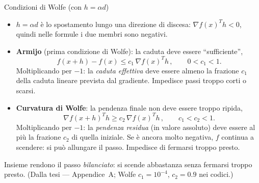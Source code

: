 \documentclass[aspectratio=169,11pt]{beamer}
\begin{document}
\begin{frame}{Condizioni di Wolfe (con $h=\alpha d$)}
  \footnotesize
  \setlength{\abovedisplayskip}{1pt}
  \setlength{\belowdisplayskip}{1pt}
  \setlength{\abovedisplayshortskip}{1pt}
  \setlength{\belowdisplayshortskip}{1pt}
  \begin{itemize}\setlength{\itemsep}{1pt}
    \item $h=\alpha d$ è lo spostamento lungo una direzione di discesa:
      $\nabla f(x)^Th<0$, quindi nelle formule i due membri sono negativi.
    \item \textbf{Armijo} (prima condizione di Wolfe): la caduta deve essere
      ``sufficiente'',
      \[
        \boxed{\,f(x+h)-f(x)\le c_1\,\nabla f(x)^Th\,},\qquad 0<c_1<1.
      \]
      Moltiplicando per $-1$: la \emph{caduta effettiva} deve essere almeno
      la frazione $c_1$ della caduta lineare prevista dal gradiente.
      Impedisce passi troppo corti o scarsi.
    \item \textbf{Curvatura di Wolfe}: la pendenza finale non deve essere
      troppo ripida,
      \[
        \boxed{\,\nabla f(x+h)^Th\ge c_2\,\nabla f(x)^Th\,},\qquad c_1<c_2<1.
      \]
      Moltiplicando per $-1$: la \emph{pendenza residua} (in valore assoluto)
      deve essere al più la frazione $c_2$ di quella iniziale. Se è ancora
      molto negativa, $f$ continua a scendere: si può allungare il passo.
      Impedisce di fermarsi troppo presto.
  \end{itemize}
  \vspace{0.03cm}
  \begin{center}
  \end{center}
  \vspace{-0.05cm}
  {\small\color{grigio} Insieme rendono il passo \emph{bilanciato}: si scende
    abbastanza senza fermarsi troppo presto. (Dalla tesi --- Appendice~A;
    Wolfe $c_1{=}10^{-4}$, $c_2{=}0.9$ nei codici.)}
\end{frame}
\end{document}
